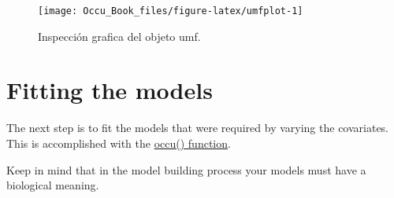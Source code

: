 \documentclass[
]{book}
\begin{document}
\begin{figure}
\texttt{[image: Occu\_Book\_files/figure-latex/umfplot-1]} \caption[fig]{Inspección grafica del objeto umf.}\label{fig:umfplot}
\end{figure}

\hypertarget{fitting-the-models}{%
\section{Fitting the models}\label{fitting-the-models}}

The next step is to fit the models that were required by varying the covariates. This is accomplished with the \href{http://www.rdocumentation.org/packages/unmarked/versions/0.11-0/topics/occu}{occu() function}.

Keep in mind that in the model building process your models must have a biological meaning.
\end{document}
